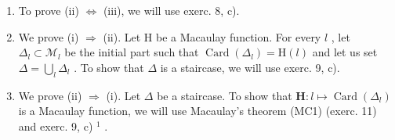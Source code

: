 \begin{enumerate}
\def\labelenumi{\alph{enumi})}
\item
  To prove (ii) \(\Leftrightarrow\) (iii), we will use exerc. 8, c).
\item
  We prove (i) \(\Rightarrow\) (ii). Let H be a Macaulay function. For every \(l\) , let \(\Delta_l \subset \mathcal{M}_l\) be the initial part such that \(\operatorname{Card}(\Delta_l) = \mathrm{H}(l)\) and let us set \(\Delta = \bigcup_{l} \Delta_l\) . To show that \(\Delta\) is a staircase, we will use exerc. 9, c).
\item
  We prove (ii) \(\Rightarrow\) (i). Let \(\Delta\) be a staircase. To show that \(\mathbf{H}: l \mapsto \operatorname{Card}(\Delta_l)\) is a Macaulay function, we will use Macaulay's theorem (MC1) (exerc. 11) and exerc. 9, c) \(^{1}\) .
\end{enumerate}
\relax{}
